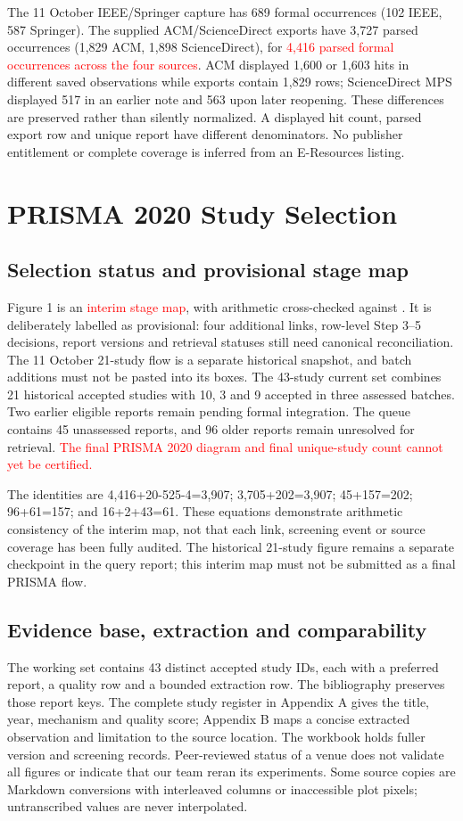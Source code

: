 \documentclass[12pt,a4paper]{article}
\newcommand{\red}[1]{\textcolor{red}{#1}}
\begin{document}
The 11 October IEEE/Springer capture has 689 formal occurrences (102 IEEE, 587 Springer). The supplied ACM/ScienceDirect exports have 3,727 parsed occurrences (1,829 ACM, 1,898 ScienceDirect), for \red{4,416 parsed formal occurrences across the four sources}. ACM displayed 1,600 or 1,603 hits in different saved observations while exports contain 1,829 rows; ScienceDirect MPS displayed 517 in an earlier note and 563 upon later reopening. These differences are preserved rather than silently normalized. A displayed hit count, parsed export row and unique report have different denominators. No publisher entitlement or complete coverage is inferred from an E-Resources listing.


\section{PRISMA 2020 Study Selection}
\subsection{Selection status and provisional stage map}
Figure 1 is an \red{interim stage map}, with arithmetic cross-checked against . It is deliberately labelled as provisional: four additional links, row-level Step 3--5 decisions, report versions and retrieval statuses still need canonical reconciliation. The 11 October 21-study flow is a separate historical snapshot, and batch additions must not be pasted into its boxes. The 43-study current set combines 21 historical accepted studies with 10, 3 and 9 accepted in three assessed batches. Two earlier eligible reports remain pending formal integration. The queue contains 45 unassessed reports, and 96 older reports remain unresolved for retrieval. \red{The final PRISMA 2020 diagram and final unique-study count cannot yet be certified.}



The identities are 4,416+20-525-4=3,907; 3,705+202=3,907; 45+157=202; 96+61=157; and 16+2+43=61. These equations demonstrate arithmetic consistency of the interim map, not that each link, screening event or source coverage has been fully audited. The historical 21-study figure remains a separate checkpoint in the query report; this interim map must not be submitted as a final PRISMA flow.

\subsection{Evidence base, extraction and comparability}
The working set contains 43 distinct accepted study IDs, each with a preferred report, a quality row and a bounded extraction row. The bibliography preserves those report keys. The complete study register in Appendix A gives the title, year, mechanism and quality score; Appendix B maps a concise extracted observation and limitation to the source location. The workbook holds fuller version and screening records. Peer-reviewed status of a venue does not validate all figures or indicate that our team reran its experiments. Some source copies are Markdown conversions with interleaved columns or inaccessible plot pixels; untranscribed values are never interpolated.
\end{document}
